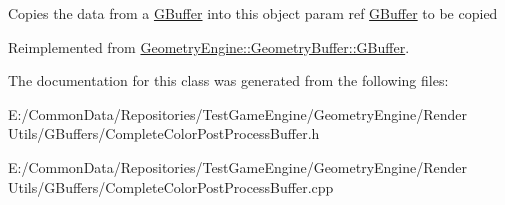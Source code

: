 Copies the data from a \mbox{\hyperlink{class_geometry_engine_1_1_geometry_buffer_1_1_g_buffer}{G\+Buffer}} into this object param ref \mbox{\hyperlink{class_geometry_engine_1_1_geometry_buffer_1_1_g_buffer}{G\+Buffer}} to be copied 

Reimplemented from \mbox{\hyperlink{class_geometry_engine_1_1_geometry_buffer_1_1_g_buffer_a9f20eb78703ef048d59a54f90ee09f25}{Geometry\+Engine\+::\+Geometry\+Buffer\+::\+G\+Buffer}}.



The documentation for this class was generated from the following files\+:\begin{DoxyCompactItemize}
\item 
E\+:/\+Common\+Data/\+Repositories/\+Test\+Game\+Engine/\+Geometry\+Engine/\+Render Utils/\+G\+Buffers/Complete\+Color\+Post\+Process\+Buffer.\+h\item 
E\+:/\+Common\+Data/\+Repositories/\+Test\+Game\+Engine/\+Geometry\+Engine/\+Render Utils/\+G\+Buffers/Complete\+Color\+Post\+Process\+Buffer.\+cpp\end{DoxyCompactItemize}
